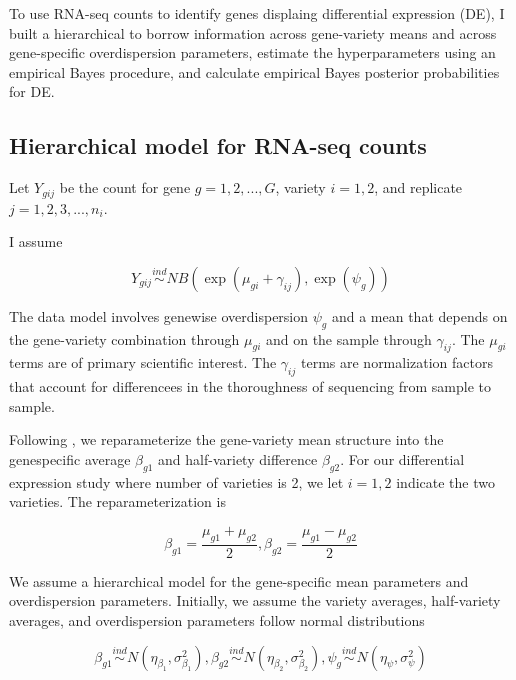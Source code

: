 \documentclass[11pt]{isuthesis}
\begin{document}
To use RNA-seq counts to identify genes displaing differential expression (DE), I built a hierarchical to borrow information across gene-variety means and across gene-specific overdispersion parameters, estimate the hyperparameters using an empirical Bayes procedure, and calculate empirical Bayes posterior probabilities for DE. 

\subsection{Hierarchical model for RNA-seq counts}

Let $Y_{gij}$ be the count for gene $g=1,2,..., G$, variety $i=1,2$, and replicate $j=1,2,3,...,n_i$.

I assume

\begin{equation}
\label{eq:1}
Y_{gij} \stackrel{ind}{\sim} NB(\exp(\mu_{gi}+\gamma_{ij}), \exp(\psi_g))
\end{equation}

The data model involves genewise overdispersion $\psi_g$ and a mean that depends on the gene-variety combination through $\mu_{gi}$ and on the sample through $\gamma_{ij}$. The $\mu_{gi}$ terms are of primary scientific interest. The $\gamma_{ij}$ terms are normalization factors that account for differencees in the thoroughness of sequencing from sample to sample. 

Following \citep{ji2014estimation}, we reparameterize the gene-variety mean structure into the genespecific average $\beta_{g1}$ and half-variety difference $\beta_{g2}$. For our differential expression study where number of varieties is 2, we let $i=1,2$ indicate the two varieties. The reparameterization is

\begin{equation}
\label{eq:2}
\beta_{g1} = \frac{\mu_{g1}+\mu_{g2}}{2}, \beta_{g2} = \frac{\mu_{g1}-\mu_{g2}}{2}
\end{equation}

We assume a hierarchical model for the gene-specific mean parameters and overdispersion parameters. Initially, we assume the variety averages, half-variety averages, and overdispersion parameters follow normal distributions

\begin{equation}
\label{eq:3}
\beta_{g1} \stackrel{ind}{\sim} N(\eta_{\beta_1}, \sigma^2_{\beta_1}), \beta_{g2} \stackrel{ind}{\sim} N(\eta_{\beta_2} , \sigma^2_{\beta_2}), \psi_g \stackrel{ind}{\sim} N(\eta_\psi, \sigma^2_\psi)
\end{equation}
\end{document}
